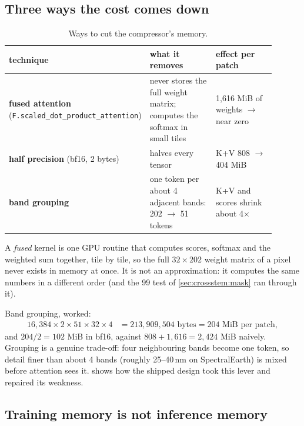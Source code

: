 \subsection{Three ways the cost comes down}

\begin{table}[htbp]\centering
\caption{Ways to cut the compressor's memory.}\label{tab:crossstem:levers}
\begin{tabular}{p{0.24\linewidth}p{0.34\linewidth}p{0.32\linewidth}}\toprule
technique & what it removes & effect per patch\\\midrule
\textbf{fused attention} (\texttt{F.scaled\_\allowbreak dot\_\allowbreak product\_\allowbreak attention}) & never stores the full weight matrix; computes the softmax in small tiles & 1,616 MiB of weights $\to$ near zero\\
\textbf{half precision} (bf16, 2 bytes) & halves every tensor & K+V 808 $\to$ 404 MiB\\
\textbf{band grouping} & one token per about 4 adjacent bands: 202 $\to$ 51 tokens & K+V and scores shrink about 4$\times$\\\bottomrule
\end{tabular}
\end{table}

A \emph{fused} kernel is one GPU routine that computes scores, softmax and the weighted sum together, tile by tile, so the full $32\times202$ weight matrix of a pixel never exists in memory at once. It is not an approximation: it computes the same numbers in a different order (and the 99 test of \cref{sec:crossstem:mask} ran through it).

Band grouping, worked:
\begin{align*}
  16{,}384\times2\times51\times32\times4 &= 213{,}909{,}504 \text{ bytes} = 204 \text{ MiB per patch},
\end{align*}
and $204/2 = 102$ MiB in bf16, against $808 + 1{,}616 = 2{,}424$ MiB naively. Grouping is a genuine trade-off: four neighbouring bands become one token, so detail finer than about 4 bands (roughly 25--40\,nm on SpectralEarth) is mixed before attention sees it.  shows how the shipped design took this lever and repaired its weakness.

\subsection{Training memory is not inference memory}

